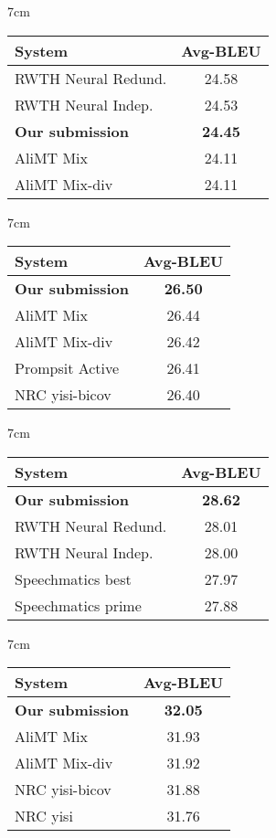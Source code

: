 \documentclass[11pt,a4paper]{article}
\begin{document}
 \begin{table*}[t]
\centering
\begin{subtable}[t]{7cm}\centering
\begin{tabular}{p{4cm}c} \toprule
System & Avg-BLEU \\ \midrule
RWTH Neural Redund. & 24.58 \\
RWTH Neural Indep. & 24.53 \\
\bf  Our submission  & \bf 24.45 \\
AliMT Mix  & 24.11 \\
AliMT Mix-div & 24.11 \\
\bottomrule
\end{tabular}
\caption{SMT 10M}
\end{subtable}\quad%
\begin{subtable}[t]{7cm}\centering
\begin{tabular}{p{4cm}c} \toprule
System & Avg-BLEU \\ \midrule
\bf  Our submission  & \bf 26.50 \\
AliMT Mix & 26.44  \\
AliMT Mix-div & 26.42 \\
Prompsit Active & 26.41 \\
NRC yisi-bicov & 26.40 \\
\bottomrule
\end{tabular}
\caption{SMT 100M}
\end{subtable}
\vspace{0.5cm}

\begin{subtable}[t]{7cm}\centering
\begin{tabular}{p{4cm}c} \toprule
System & Avg-BLEU \\ \midrule
\bf  Our submission  & \bf 28.62 \\
RWTH Neural Redund. & 28.01 \\
RWTH Neural Indep. & 28.00 \\
Speechmatics best & 27.97 \\
Speechmatics prime & 27.88 \\
\bottomrule
\end{tabular}
\caption{NMT 10M}
\end{subtable}\quad%
\begin{subtable}[t]{7cm}\centering
\begin{tabular}{p{4cm}c} \toprule
System & Avg-BLEU \\ \midrule
\bf Our submission  & \bf 32.05 \\
AliMT Mix & 31.93  \\
AliMT Mix-div & 31.92 \\
NRC yisi-bicov & 31.88 \\
NRC yisi & 31.76 \\
\bottomrule
\end{tabular}
\caption{NMT 100M}
\end{subtable}
\vspace{0.5cm}


\end{table*}
\end{document}

